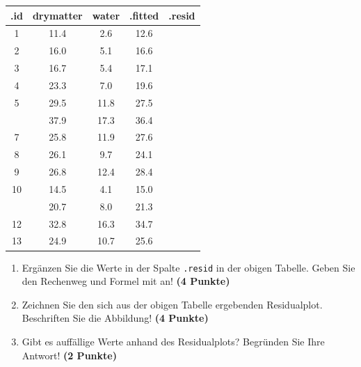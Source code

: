 \documentclass[a4paper, 10pt]{scrartcl}\usepackage[]{graphicx}\usepackage[]{xcolor}
\newenvironment{knitrout}{}{} %
\begin{document}
\begin{knitrout}
\color{fgcolor}\begin{table}[!h]
\centering\begingroup\fontsize{12}{14}\selectfont

\begin{tabular}{ccccc}
\toprule
.id & drymatter & water & .fitted & .resid\\
\midrule
1 & 11.4 & 2.6 & 12.6 & \\
2 & 16.0 & 5.1 & 16.6 & \\
3 & 16.7 & 5.4 & 17.1 & \\
4 & 23.3 & 7.0 & 19.6 & \\
5 & 29.5 & 11.8 & 27.5 & \\
\addlinespace
6 & 37.9 & 17.3 & 36.4 & \\
7 & 25.8 & 11.9 & 27.6 & \\
8 & 26.1 & 9.7 & 24.1 & \\
9 & 26.8 & 12.4 & 28.4 & \\
10 & 14.5 & 4.1 & 15.0 & \\
\addlinespace
11 & 20.7 & 8.0 & 21.3 & \\
12 & 32.8 & 16.3 & 34.7 & \\
13 & 24.9 & 10.7 & 25.6 & \\
\bottomrule
\end{tabular}
\endgroup{}
\end{table}

\end{knitrout}

\begin{enumerate}
\item Erg{\"a}nzen Sie die Werte in der Spalte \texttt{.resid} in der obigen
  Tabelle. Geben Sie den Rechenweg und Formel mit an! \textbf{(4 Punkte)}
\item Zeichnen Sie den sich aus der obigen Tabelle ergebenden
  Residualplot. Beschriften Sie die Abbildung! \textbf{(4 Punkte)}
\item Gibt es auff{\"a}llige Werte anhand des Residualplots? Begr{\"u}nden Sie Ihre
  Antwort! \textbf{(2 Punkte)}
\end{enumerate}
 
\end{document}
